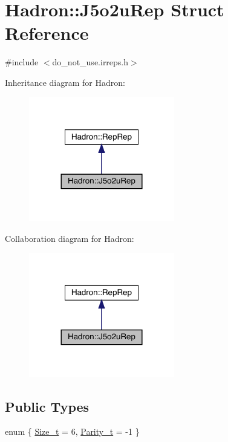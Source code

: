 \hypertarget{structHadron_1_1J5o2uRep}{}\section{Hadron\+:\+:J5o2u\+Rep Struct Reference}
\label{structHadron_1_1J5o2uRep}


{\ttfamily \#include $<$do\+\_\+not\+\_\+use.\+irreps.\+h$>$}



Inheritance diagram for Hadron\+:\nopagebreak
\begin{figure}[H]
\begin{center}
\leavevmode
\includegraphics[width=180pt]{da/dff/structHadron_1_1J5o2uRep__inherit__graph}
\end{center}
\end{figure}


Collaboration diagram for Hadron\+:\nopagebreak
\begin{figure}[H]
\begin{center}
\leavevmode
\includegraphics[width=180pt]{dc/d5d/structHadron_1_1J5o2uRep__coll__graph}
\end{center}
\end{figure}
\subsection*{Public Types}
\begin{DoxyCompactItemize}
\item 
enum \{ \mbox{\hyperlink{structHadron_1_1J5o2uRep_aabd989a0b784c7866564227122cd72faafc46f8dff09a3a12c9f379e56a682f24}{Size\+\_\+t}} = 6, 
\mbox{\hyperlink{structHadron_1_1J5o2uRep_aabd989a0b784c7866564227122cd72faaf756864049cba594338f33329a4ddbda}{Parity\+\_\+t}} = -\/1
 \}
\end{DoxyCompactItemize}
